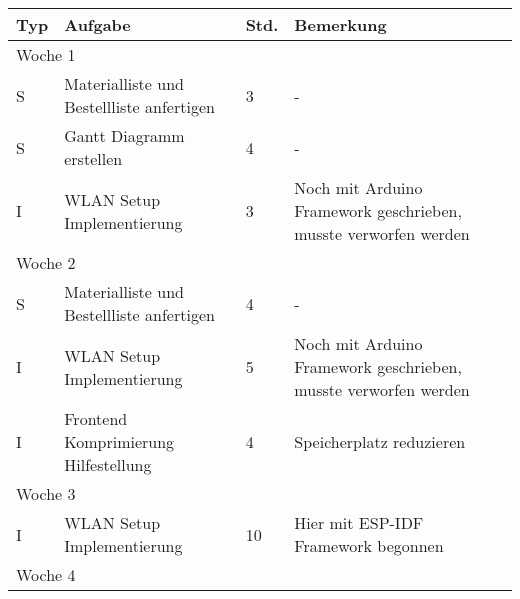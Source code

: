 \vspace{1em}
\begin{table}[!hp]
    \begin{center}
        \begin{tabular}{|p{0.8cm}|p{6cm}|p{0.8cm}|p{8cm}|} \hline
            \textbf{Typ} & \textbf{Aufgabe}                          & \textbf{Std.} & \textbf{Bemerkung}                                              \\ \hline
            \multicolumn{4}{|l|}{Woche 1}                                                                                                              \\ \hline
            S            & Materialliste und Bestellliste anfertigen & 3             & -                                                               \\
            S            & Gantt Diagramm erstellen                  & 4             & -                                                               \\
            I            & WLAN Setup Implementierung                & 3             & Noch mit Arduino Framework geschrieben, musste verworfen werden \\ \hline
            \multicolumn{4}{|l|}{Woche 2}                                                                                                              \\ \hline
            S            & Materialliste und Bestellliste anfertigen & 4             & -                                                               \\
            I            & WLAN Setup Implementierung                & 5             & Noch mit Arduino Framework geschrieben, musste verworfen werden \\
            I            & Frontend Komprimierung Hilfestellung      & 4             & Speicherplatz reduzieren                                        \\ \hline
            \multicolumn{4}{|l|}{Woche 3}                                                                                                              \\ \hline
            I            & WLAN Setup Implementierung                & 10            & Hier mit ESP-IDF Framework begonnen                             \\ \hline
            \multicolumn{4}{|l|}{Woche 4}                                                                                                              \\ \hline

\end{tabular}
\end{center}
\end{table}
